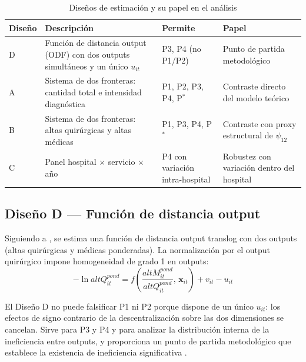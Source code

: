 \begin{table}[htbp]
\centering
\caption{Diseños de estimación y su papel en el análisis}
\label{tab:disenos}
\begin{threeparttable}
\small
\begin{tabular}{p{1.2cm}p{3.5cm}p{2.5cm}p{3.5cm}}
\toprule
\textbf{Diseño} & \textbf{Descripción} &
\textbf{Permite} & \textbf{Papel} \\
\midrule
D & Función de distancia output (ODF) con dos outputs simultáneos y un único $u_{it}$
  & P3, P4 (no P1/P2)
  & Punto de partida metodológico \\[6pt]
A & Sistema de dos fronteras: cantidad total e intensidad diagnóstica
  & P1, P2, P3, P4, P$^*$
  & Contraste directo del modelo teórico \\[6pt]
B & Sistema de dos fronteras: altas quirúrgicas y altas médicas
  & P1, P3, P4, P$^*$
  & Contraste con proxy estructural de $\psi_{12}$ \\[6pt]
C & Panel hospital $\times$ servicio $\times$ año
  & P4 con variación intra-hospital
  & Robustez con variación dentro del hospital \\
\bottomrule
\end{tabular}
\end{threeparttable}
\end{table}

\subsection{Diseño D --- Función de distancia output}

Siguiendo a \citet{coelli1999}, se estima una función de distancia output translog con dos outputs (altas quirúrgicas y médicas ponderadas). La normalización por el output quirúrgico impone homogeneidad de grado 1 en outputs:
\begin{equation}
  -\ln altQ^{pond}_{it} = f\!\left(\frac{altM^{pond}_{it}}{altQ^{pond}_{it}},\, \mathbf{x}_{it}\right) + v_{it} - u_{it}
  \label{eq:odf}
\end{equation}

El Diseño D no puede falsificar P1 ni P2 porque dispone de un único $u_{it}$: los efectos de signo contrario de la descentralización sobre las dos dimensiones se cancelan. Sirve para P3 y P4 y para analizar la distribución interna de la ineficiencia entre outputs, y proporciona un punto de partida metodológico que establece la existencia de ineficiencia significativa \citep{coelli2005}.

